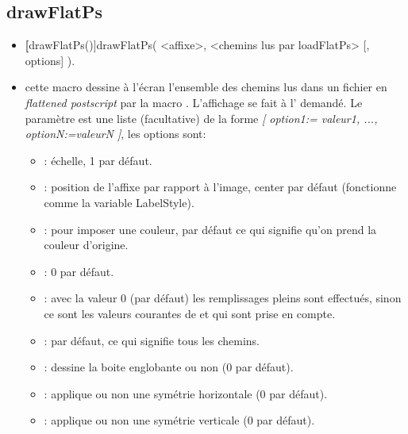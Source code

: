 \subsection{drawFlatPs}\label{macdrawFlatPs}
\begin{itemize}
 \item \util \textbf[drawFlatPs()]{drawFlatPs( <affixe>, <chemins lus par loadFlatPs> [, options] )}.
 \item \desc cette macro dessine à l'écran l'ensemble des chemins lus dans un fichier en \textit{flattened postscript} par la macro . L'affichage se fait à l' demandé. Le paramètre  est une liste (facultative) de la forme \textsl{[ option1:= valeur1, ..., optionN:=valeurN ]}, les options sont:
  \begin{itemize}
  \item {}: échelle, 1 par défaut.
  \item {}: position de l'affixe par rapport à l'image, center par défaut (fonctionne comme la variable LabelStyle).
  \item {}: pour imposer une couleur, \Nil par défaut ce qui signifie qu'on prend la couleur d'origine.
  \item {}: 0 par défaut.
  \item {}: avec la valeur 0 (par défaut) les remplissages pleins sont effectués, sinon ce sont les valeurs courantes de  et  qui sont prise en compte.
  \item {}: \Nil par défaut, ce qui signifie tous les chemins.
    \item {}: dessine la boite englobante ou non ($0$ par défaut).
  \item {}: applique ou non une symétrie horizontale ($0$ par défaut).
  \item {}: applique ou non une symétrie verticale ($0$ par défaut).
  \end{itemize}

\end{itemize}

